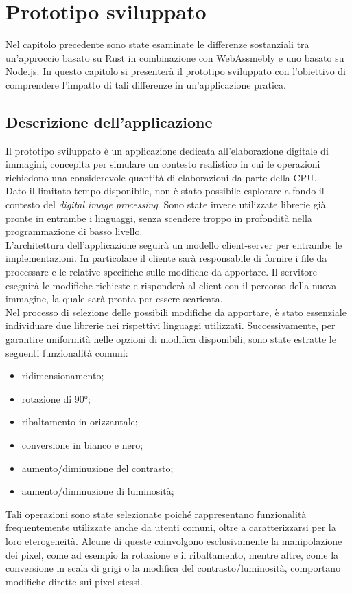 \chapter{Prototipo sviluppato}
\label{chap:3}
Nel capitolo precedente sono state esaminate le differenze sostanziali tra un'approccio basato su Rust in combinazione con WebAssmebly e uno basato su Node.js.
In questo capitolo si presenterà il prototipo sviluppato con l'obiettivo di comprendere l'impatto di tali differenze in un'applicazione pratica.
\section{Descrizione dell'applicazione}
Il prototipo sviluppato è un applicazione dedicata all'elaborazione digitale di immagini, concepita per simulare un contesto realistico in cui le operazioni richiedono una considerevole quantità di elaborazioni da parte della CPU.
\\Dato il limitato tempo disponibile, non è stato possibile esplorare a fondo il contesto del \emph{digital image processing}. Sono state invece utilizzate librerie già pronte in entrambe i linguaggi, senza scendere troppo in profondità nella programmazione di basso livello.
\\L'architettura dell'applicazione seguirà un modello client-server per entrambe le implementazioni.
In particolare il cliente sarà responsabile di fornire i file da processare e le relative specifiche sulle modifiche da apportare.
Il servitore eseguirà le modifiche richieste e risponderà al client con il percorso della nuova immagine, la quale sarà pronta per essere scaricata.
\\Nel processo di selezione delle possibili modifiche da apportare, è stato essenziale individuare due librerie nei rispettivi linguaggi utilizzati.
Successivamente, per garantire uniformità nelle opzioni di modifica disponibili, sono state estratte le seguenti funzionalità comuni: 
\begin{itemize}
    \item ridimensionamento;
    \item rotazione di 90°;
    \item ribaltamento in orizzantale;
    \item conversione in bianco e nero;
    \item aumento/diminuzione del contrasto;
    \item aumento/diminuzione di luminosità;
\end{itemize}
Tali operazioni sono state selezionate poiché rappresentano funzionalità frequentemente utilizzate anche da utenti comuni, oltre a caratterizzarsi per la loro eterogeneità. Alcune di queste coinvolgono esclusivamente la manipolazione dei pixel, come ad esempio la rotazione e il ribaltamento, mentre altre, come la conversione in scala di grigi o la modifica del contrasto/luminosità, comportano modifiche dirette sui pixel stessi.
\newpage
